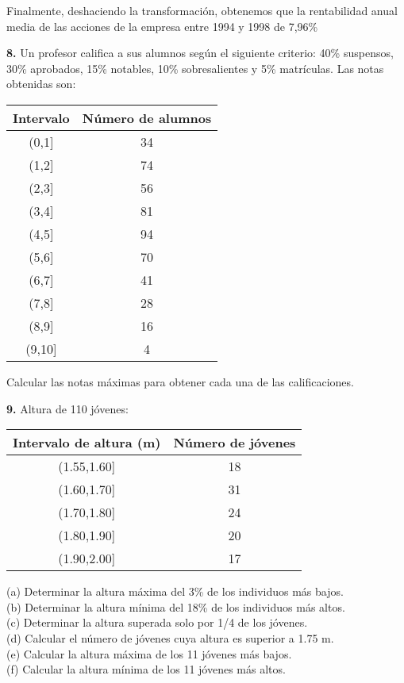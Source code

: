 \documentclass[a4paper,12pt]{article}
\begin{document}
Finalmente, deshaciendo la transformación, obtenemos que la rentabilidad anual media de las acciones de la empresa entre 1994 y 1998 de 7,96\%


\newpage
\textbf{8.} Un profesor califica a sus alumnos según el siguiente criterio: 40\% suspensos, 30\% aprobados, 15\% notables, 10\% sobresalientes y 5\% matrículas. Las notas obtenidas son:

\begin{center}
    \begin{tabular}{c|c}
        Intervalo & Número de alumnos \\
        \hline
        (0,1] & 34 \\
        (1,2] & 74 \\
        (2,3] & 56 \\
        (3,4] & 81 \\
        (4,5] & 94 \\
        (5,6] & 70 \\
        (6,7] & 41 \\
        (7,8] & 28 \\
        (8,9] & 16 \\
        (9,10] & 4 \\
    \end{tabular}
\end{center}

Calcular las notas máximas para obtener cada una de las calificaciones. 

\vspace{0.5cm}
\textbf{9.} Altura de 110 jóvenes:

\begin{center}
    \begin{tabular}{c|c}
        Intervalo de altura (m) & Número de jóvenes \\
        \hline
        (1.55,1.60] & 18 \\
        (1.60,1.70] & 31 \\
        (1.70,1.80] & 24 \\
        (1.80,1.90] & 20 \\
        (1.90,2.00] & 17 \\
    \end{tabular}
\end{center}

(a) Determinar la altura máxima del 3\% de los individuos más bajos.\\
(b) Determinar la altura mínima del 18\% de los individuos más altos.\\
(c) Determinar la altura superada solo por 1/4 de los jóvenes.\\
(d) Calcular el número de jóvenes cuya altura es superior a 1.75 m.\\
(e) Calcular la altura máxima de los 11 jóvenes más bajos.\\
(f) Calcular la altura mínima de los 11 jóvenes más altos.
\end{document}
